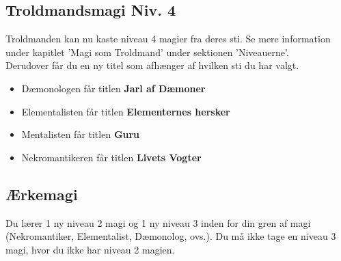 \subsection{Troldmandsmagi Niv. 4}
Troldmanden kan nu kaste niveau 4 magier fra deres sti. Se mere information under kapitlet 'Magi som Troldmand' under sektionen 'Niveauerne'. \\
Derudover får du en ny titel som afhænger af hvilken sti du har valgt.\\
\begin{itemize}
    \item Dæmonologen får titlen \textbf{Jarl af Dæmoner}
    \item Elementalisten får titlen \textbf{Elementernes hersker}
    \item Mentalisten får titlen \textbf{Guru}
    \item Nekromantikeren får titlen \textbf{Livets Vogter}
\end{itemize}

\subsection{Ærkemagi}
Du lærer 1 ny niveau 2 magi og 1 ny niveau 3 inden for din gren af magi (Nekromantiker, Elementalist, Dæmonolog, ovs.). Du må ikke tage en niveau 3 magi, hvor du ikke har niveau 2 magien.
